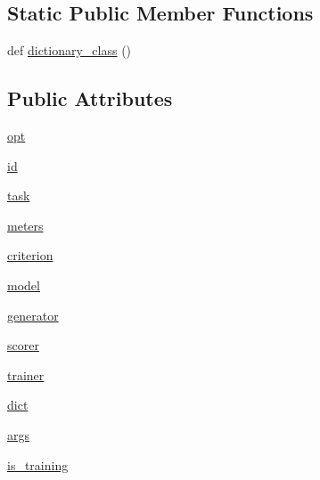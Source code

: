 \subsection*{Static Public Member Functions}
\begin{DoxyCompactItemize}
\item 
def \hyperlink{classparlai_1_1agents_1_1fairseq_1_1fairseq_1_1FairseqAgent_a3dc59646a2e97d015dfdddb65021429b}{dictionary\+\_\+class} ()
\end{DoxyCompactItemize}
\subsection*{Public Attributes}
\begin{DoxyCompactItemize}
\item 
\hyperlink{classparlai_1_1agents_1_1fairseq_1_1fairseq_1_1FairseqAgent_a0029f91bc5f186deb354f2309c837dc0}{opt}
\item 
\hyperlink{classparlai_1_1agents_1_1fairseq_1_1fairseq_1_1FairseqAgent_a4803335baa37f554df0386bbcb4d7046}{id}
\item 
\hyperlink{classparlai_1_1agents_1_1fairseq_1_1fairseq_1_1FairseqAgent_a40ba5a4ef148b203f84308703d497e35}{task}
\item 
\hyperlink{classparlai_1_1agents_1_1fairseq_1_1fairseq_1_1FairseqAgent_ac675e98e191e3d2eb2128d0ea939e80d}{meters}
\item 
\hyperlink{classparlai_1_1agents_1_1fairseq_1_1fairseq_1_1FairseqAgent_a72d90ad69b45bbffb9da869df770bc40}{criterion}
\item 
\hyperlink{classparlai_1_1agents_1_1fairseq_1_1fairseq_1_1FairseqAgent_a5254289bcf109acda42e3cf3e4316b4f}{model}
\item 
\hyperlink{classparlai_1_1agents_1_1fairseq_1_1fairseq_1_1FairseqAgent_a1aa9a392946ff3d907abec616e8d7306}{generator}
\item 
\hyperlink{classparlai_1_1agents_1_1fairseq_1_1fairseq_1_1FairseqAgent_a677c5d13f46909154b93529fa1dfc5bf}{scorer}
\item 
\hyperlink{classparlai_1_1agents_1_1fairseq_1_1fairseq_1_1FairseqAgent_a8da014b113d3c65ed6c3238dcf2631f1}{trainer}
\item 
\hyperlink{classparlai_1_1agents_1_1fairseq_1_1fairseq_1_1FairseqAgent_a3dd0117fcddb466d7654000fdd9a9092}{dict}
\item 
\hyperlink{classparlai_1_1agents_1_1fairseq_1_1fairseq_1_1FairseqAgent_a46b06885bc5c7feb87947788f74939aa}{args}
\item 
\hyperlink{classparlai_1_1agents_1_1fairseq_1_1fairseq_1_1FairseqAgent_a5c6b4065ff551fb51e119d4c69dfb1cd}{is\+\_\+training}
\end{DoxyCompactItemize}
